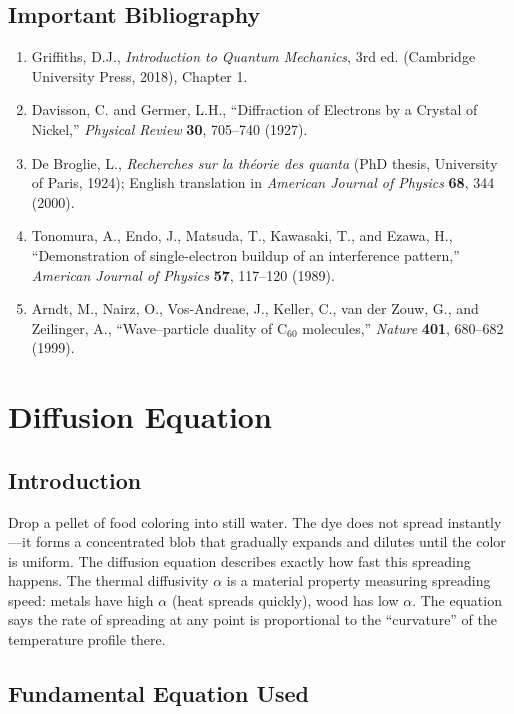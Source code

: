 \documentclass[11pt,openright]{book}
\begin{document}
\section*{Important Bibliography}
\begin{enumerate}
\item Griffiths, D.J., \textit{Introduction to Quantum Mechanics}, 3rd ed. (Cambridge University Press, 2018), Chapter 1.
\item Davisson, C. and Germer, L.H., ``Diffraction of Electrons by a Crystal of Nickel,'' \textit{Physical Review} \textbf{30}, 705--740 (1927).
\item De Broglie, L., \textit{Recherches sur la théorie des quanta} (PhD thesis, University of Paris, 1924); English translation in \textit{American Journal of Physics} \textbf{68}, 344 (2000).
\item Tonomura, A., Endo, J., Matsuda, T., Kawasaki, T., and Ezawa, H., ``Demonstration of single-electron buildup of an interference pattern,'' \textit{American Journal of Physics} \textbf{57}, 117--120 (1989).
\item Arndt, M., Nairz, O., Vos-Andreae, J., Keller, C., van der Zouw, G., and Zeilinger, A., ``Wave--particle duality of C$_{60}$ molecules,'' \textit{Nature} \textbf{401}, 680--682 (1999).
\end{enumerate}


\chapter{Diffusion Equation}

\section*{Introduction}

Drop a pellet of food coloring into still water. The dye does not spread instantly---it forms a concentrated blob that gradually expands and dilutes until the color is uniform. The diffusion equation describes exactly how fast this spreading happens. The thermal diffusivity $\alpha$ is a material property measuring spreading speed: metals have high $\alpha$ (heat spreads quickly), wood has low $\alpha$. The equation says the rate of spreading at any point is proportional to the ``curvature'' of the temperature profile there.
\section*{Fundamental Equation Used}
\end{document}
